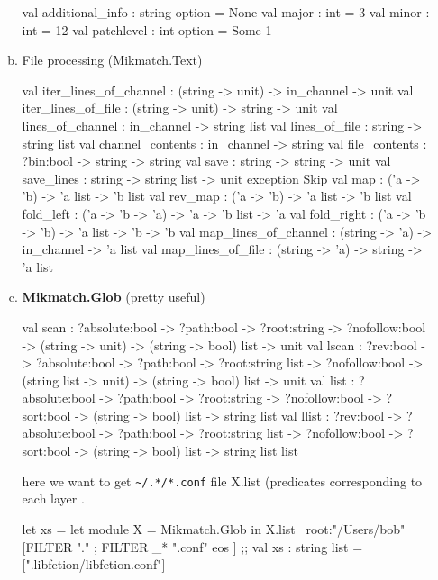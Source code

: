 \begin{enumerate}
\begin{enumerate}[(a)]
\begin{ocamlcode}      
val additional_info : string option = None
val major : int = 3
val minor : int = 12
val patchlevel : int option = Some 1    
\end{ocamlcode}


\item File processing (Mikmatch.Text)

  \begin{ocamlcode}
    val iter_lines_of_channel : (string -> unit) -> in_channel -> unit
    val iter_lines_of_file : (string -> unit) -> string -> unit
    val lines_of_channel : in_channel -> string list
    val lines_of_file : string -> string list
    val channel_contents : in_channel -> string
    val file_contents : ?bin:bool -> string -> string
    val save : string -> string -> unit
    val save_lines : string -> string list -> unit
    exception Skip
    val map : ('a -> 'b) -> 'a list -> 'b list
    val rev_map : ('a -> 'b) -> 'a list -> 'b list
    val fold_left : ('a -> 'b -> 'a) -> 'a -> 'b list -> 'a
    val fold_right : ('a -> 'b -> 'b) -> 'a list -> 'b -> 'b
    val map_lines_of_channel : (string -> 'a) -> in_channel -> 'a list
    val map_lines_of_file : (string -> 'a) -> string -> 'a list
\end{ocamlcode}
\item \textbf{Mikmatch.Glob} (pretty useful)

  \begin{ocamlcode}
    val scan :
      ?absolute:bool ->
      ?path:bool ->
      ?root:string ->
      ?nofollow:bool -> (string -> unit) -> (string -> bool) list -> unit
    val lscan :
      ?rev:bool ->
      ?absolute:bool ->
      ?path:bool ->
      ?root:string list ->
      ?nofollow:bool ->
      (string list -> unit) -> (string -> bool) list -> unit
    val list :
      ?absolute:bool ->
      ?path:bool ->
      ?root:string ->
      ?nofollow:bool -> ?sort:bool -> (string -> bool) list -> string list
    val llist :
      ?rev:bool ->
      ?absolute:bool ->
      ?path:bool ->
      ?root:string list ->
      ?nofollow:bool ->
      ?sort:bool -> (string -> bool) list -> string list list
    \end{ocamlcode}

    here we want to get  \verb|~/.*/*.conf| file
    X.list (predicates corresponding to each layer .
    \begin{alternate}
let xs = let module X = Mikmatch.Glob in X.list ~root:"/Users/bob" [FILTER "." ; FILTER _* ".conf" eos ] ;;
val xs : string list = [".libfetion/libfetion.conf"]
\end{alternate}


\end{enumerate}
\end{enumerate}

